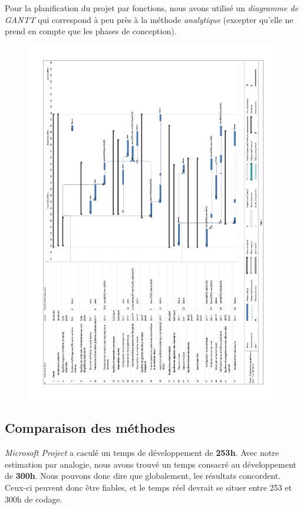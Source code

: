 Pour la planification du projet par fonctions, nous avons utilisé un \emph{diagramme de GANTT} qui correspond à peu près à la méthode \emph{analytique} (excepter qu'elle ne prend en compte que les phases de conception).
\begin{figure}
\includegraphics[width=15cm]{../Diagramme_gante.png}
\end{figure}
\clearpage

\subsection{Comparaison des méthodes}
\emph{Microsoft Project} a caculé un temps de développement de \textbf{253h}. 
Avec notre estimation par analogie, nous avons trouvé un temps consacré au développement de \textbf{300h}. 
Nous pouvons donc dire que globalement, les résultats concordent. 
Ceux-ci peuvent donc être fiables, et le temps réel devrait se situer entre 253 et 300h de codage. 

